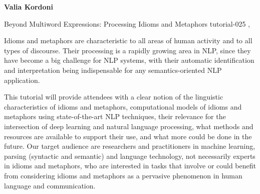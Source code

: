 \begin{bio}
  {\bfseries Valia Kordoni}


\end{bio}

\begin{tutorial}
  {Beyond Multiword Expressions: Processing Idioms and Metaphors}
  {tutorial-025}
  {\daydateyear, \tutorialafternoontime}
  {\TutLocE}

Idioms and metaphors are characteristic to all areas of human activity and to all types of discourse. Their processing is a rapidly growing area in NLP, since they have become a big challenge for NLP systems, with their automatic identification and interpretation being indispensable for any semantics-oriented NLP application.

This tutorial will provide attendees with a clear notion of the linguistic characteristics of idioms and metaphors, computational models of idioms and metaphors using state-of-the-art NLP techniques, their relevance for the intersection of deep learning and natural language processing, what methods and resources are available to support their use, and what more could be done in the future. Our target audience are researchers and practitioners in machine learning, parsing (syntactic and semantic) and language technology, not necessarily experts in idioms and metaphors, who are interested in tasks that involve or could benefit from considering idioms and metaphors as a pervasive phenomenon in human language and communication.


\end{tutorial}
